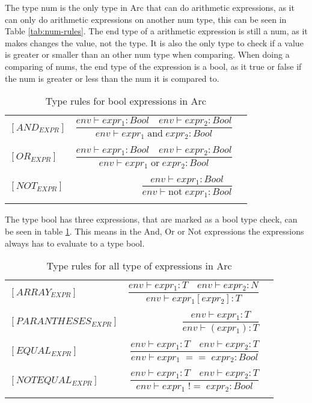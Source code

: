 The type num is the only type in Arc that can do arithmetic expressions, as it can only do arithmetic expressions on another num type, this can be seen in Table \ref*{tab:num-rules}. The end type of a arithmetic expression is still a num, as it makes changes the value, not the type. It is also the only type to check if a value is greater or smaller than an other num type when comparing. When doing a comparing of nums, the end type of the expression is a bool, as it true or false if the num is greater or less than the num it is compared to.

\begin{table}[htb!]
    \centering
    \begin{tabular}{lr>{\raggedright\arraybackslash}p{6cm}}
    $[AND_{EXPR}] $        & $\dfrac
        {env\vdash expr_1: Bool \quad env\vdash expr_2: Bool}
        {env\vdash expr_1 \;\text{and} \;expr_2: Bool}$
    \\
    \\
    $[OR_{EXPR}] $         & $\dfrac
        {env\vdash expr_1: Bool \quad env\vdash expr_2: Bool}
        {env\vdash expr_1 \;\text{or} \;expr_2: Bool}$
    \\
    \\
    $[NOT_{EXPR}] $        & $\dfrac
        {env\vdash expr_1: Bool}
        {env\vdash \text{not} \; expr_1 : Bool}$
    \\
    \\
    \end{tabular}
    \caption{Type rules for bool expressions in Arc}
    \label{tab:bool-rules}
\end{table}

The type bool has three expressions, that are marked as a bool type check, can be seen in table \ref*{tab:bool-rules}. This means in the And, Or or Not expressions the expressions always has to evaluate to a type bool. 

\begin{table}[htb!]
    \centering
    \begin{tabular}{lr>{\raggedright\arraybackslash}p{6cm}}
        $[ARRAY_{EXPR}]$       & $ \dfrac
            {env\vdash expr_1: T \quad env \vdash expr_2 : N}
            {env\vdash expr_1[expr_2] : T}$
        \\
        \\
        $[PARANTHESES_{EXPR}]$ & $ \dfrac
            {env\vdash expr_1: T}
            {env\vdash (expr_1) : T}$
        \\
        \\
        $[EQUAL_{EXPR}] $      & $\dfrac
            {env\vdash expr_1: T \quad env\vdash expr_2: T}
            {env\vdash expr_1 \;== \;expr_2: Bool}$
        \\
        \\
        $[NOTEQUAL_{EXPR}] $   & $\dfrac
        {env\vdash expr_1: T \quad env\vdash expr_2: T}
        {env\vdash expr_1 \;!= \;expr_2: Bool}$
    \\
    \\
    \end{tabular}
    \caption{Type rules for all type of expressions in Arc}
    \label{tab:expr-rules}
\end{table}

